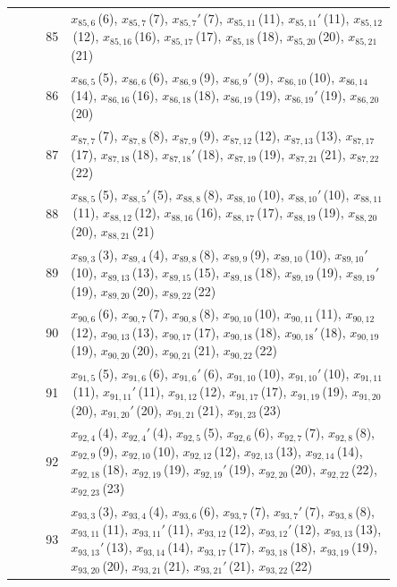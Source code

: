 \documentclass[11pt]{article}
\begin{document}
\begin{center}
\begin{longtable}{r>{\raggedright\arraybackslash}p{0.85\linewidth}}
85 & $x_{85,6}$\,(6), $x_{85,7}$\,(7), $x_{85,7}'$\,(7), $x_{85,11}$\,(11), $x_{85,11}'$\,(11), $x_{85,12}$\,(12), $x_{85,16}$\,(16), $x_{85,17}$\,(17), $x_{85,18}$\,(18), $x_{85,20}$\,(20), $x_{85,21}$\,(21) \\
86 & $x_{86,5}$\,(5), $x_{86,6}$\,(6), $x_{86,9}$\,(9), $x_{86,9}'$\,(9), $x_{86,10}$\,(10), $x_{86,14}$\,(14), $x_{86,16}$\,(16), $x_{86,18}$\,(18), $x_{86,19}$\,(19), $x_{86,19}'$\,(19), $x_{86,20}$\,(20) \\
87 & $x_{87,7}$\,(7), $x_{87,8}$\,(8), $x_{87,9}$\,(9), $x_{87,12}$\,(12), $x_{87,13}$\,(13), $x_{87,17}$\,(17), $x_{87,18}$\,(18), $x_{87,18}'$\,(18), $x_{87,19}$\,(19), $x_{87,21}$\,(21), $x_{87,22}$\,(22) \\
88 & $x_{88,5}$\,(5), $x_{88,5}'$\,(5), $x_{88,8}$\,(8), $x_{88,10}$\,(10), $x_{88,10}'$\,(10), $x_{88,11}$\,(11), $x_{88,12}$\,(12), $x_{88,16}$\,(16), $x_{88,17}$\,(17), $x_{88,19}$\,(19), $x_{88,20}$\,(20), $x_{88,21}$\,(21) \\
89 & $x_{89,3}$\,(3), $x_{89,4}$\,(4), $x_{89,8}$\,(8), $x_{89,9}$\,(9), $x_{89,10}$\,(10), $x_{89,10}'$\,(10), $x_{89,13}$\,(13), $x_{89,15}$\,(15), $x_{89,18}$\,(18), $x_{89,19}$\,(19), $x_{89,19}'$\,(19), $x_{89,20}$\,(20), $x_{89,22}$\,(22) \\
90 & $x_{90,6}$\,(6), $x_{90,7}$\,(7), $x_{90,8}$\,(8), $x_{90,10}$\,(10), $x_{90,11}$\,(11), $x_{90,12}$\,(12), $x_{90,13}$\,(13), $x_{90,17}$\,(17), $x_{90,18}$\,(18), $x_{90,18}'$\,(18), $x_{90,19}$\,(19), $x_{90,20}$\,(20), $x_{90,21}$\,(21), $x_{90,22}$\,(22) \\
91 & $x_{91,5}$\,(5), $x_{91,6}$\,(6), $x_{91,6}'$\,(6), $x_{91,10}$\,(10), $x_{91,10}'$\,(10), $x_{91,11}$\,(11), $x_{91,11}'$\,(11), $x_{91,12}$\,(12), $x_{91,17}$\,(17), $x_{91,19}$\,(19), $x_{91,20}$\,(20), $x_{91,20}'$\,(20), $x_{91,21}$\,(21), $x_{91,23}$\,(23) \\
92 & $x_{92,4}$\,(4), $x_{92,4}'$\,(4), $x_{92,5}$\,(5), $x_{92,6}$\,(6), $x_{92,7}$\,(7), $x_{92,8}$\,(8), $x_{92,9}$\,(9), $x_{92,10}$\,(10), $x_{92,12}$\,(12), $x_{92,13}$\,(13), $x_{92,14}$\,(14), $x_{92,18}$\,(18), $x_{92,19}$\,(19), $x_{92,19}'$\,(19), $x_{92,20}$\,(20), $x_{92,22}$\,(22), $x_{92,23}$\,(23) \\
93 & $x_{93,3}$\,(3), $x_{93,4}$\,(4), $x_{93,6}$\,(6), $x_{93,7}$\,(7), $x_{93,7}'$\,(7), $x_{93,8}$\,(8), $x_{93,11}$\,(11), $x_{93,11}'$\,(11), $x_{93,12}$\,(12), $x_{93,12}'$\,(12), $x_{93,13}$\,(13), $x_{93,13}'$\,(13), $x_{93,14}$\,(14), $x_{93,17}$\,(17), $x_{93,18}$\,(18), $x_{93,19}$\,(19), $x_{93,20}$\,(20), $x_{93,21}$\,(21), $x_{93,21}'$\,(21), $x_{93,22}$\,(22) \\

\end{longtable}
\end{center}
\end{document}
